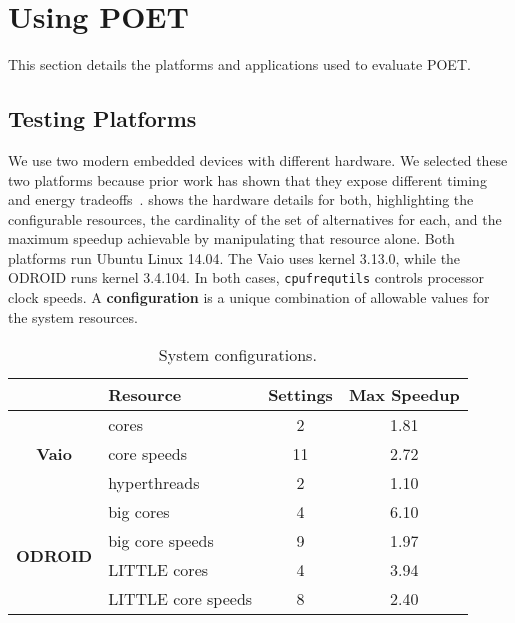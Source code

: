 \section{Using POET}
\label{sec:poet-usage}

This section details the platforms and applications used to evaluate POET.


\subsection{Testing Platforms}

We use two modern embedded devices with different hardware.
We selected these two platforms because prior work has shown that they expose different timing and energy tradeoffs~\cite{Imes2014}.
 shows the hardware details for both, highlighting the configurable resources, the cardinality of the set of alternatives for each, and the maximum speedup achievable by manipulating that resource alone.
Both platforms run Ubuntu Linux 14.04.
The Vaio uses kernel 3.13.0, while the ODROID runs kernel 3.4.104.
In both cases, \mbox{\texttt{cpufrequtils}} controls processor clock speeds.
A \textbf{configuration} is a unique combination of allowable values for the system resources.

\begin{table}[t]
\caption{System configurations.}
\centering
\begin{tabular}{clcc}
  & \textbf{Resource} & \textbf{Settings} & \textbf{Max Speedup} \\
\hline
\hline
  \multirow{3}{*}{\begin{turn}{90}\textbf{Vaio}\end{turn}} 
  & cores        &  2 & 1.81 \\
  & core speeds  & 11 & 2.72 \\
  & hyperthreads &  2 & 1.10 \\ 
\hline
\hline
  \multirow{4}{*}{\begin{turn}{90}\textbf{ODROID}\end{turn}} 
  & big cores          & 4 & 6.10 \\
  & big core speeds    & 9 & 1.97 \\
  & LITTLE cores       & 4 & 3.94 \\
  & LITTLE core speeds & 8 & 2.40 \\
\hline
\hline
\end{tabular}
\label{tbl:poet-systemknobs}
\end{table}

